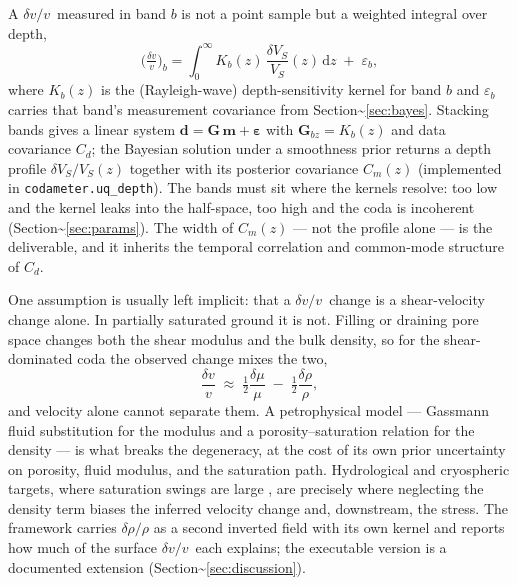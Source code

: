 \documentclass[
  11pt,
  letterpaper,
]{article}
\providecommand{\dvv}{\ensuremath{\delta v/v}}
\begin{document}
A \dvv~measured in band \(b\) is not a point sample but a weighted
integral over depth, \begin{equation}
\Big(\tfrac{\delta v}{v}\Big)_b = \int_0^\infty K_b(z)\,\frac{\delta V_S}{V_S}(z)\,\mathrm{d}z \;+\; \varepsilon_b,
\label{eq:kernel}
\end{equation} where \(K_b(z)\) is the (Rayleigh-wave) depth-sensitivity
kernel for band \(b\) and \(\varepsilon_b\) carries that band's
measurement covariance from Section\textasciitilde{}\ref{sec:bayes}.
Stacking bands gives a linear system
\(\mathbf{d}=\mathbf{G}\,\mathbf{m}+\boldsymbol\varepsilon\) with
\(\mathbf{G}_{bz}=K_b(z)\) and data covariance \(C_d\); the Bayesian
solution under a smoothness prior returns a depth profile
\(\delta V_S/V_S(z)\) together with its posterior covariance \(C_m(z)\)
(implemented in \texttt{codameter.uq\_depth}). The bands must sit where
the kernels resolve: too low and the kernel leaks into the half-space,
too high and the coda is incoherent
(Section\textasciitilde{}\ref{sec:params}). The width of \(C_m(z)\) ---
not the profile alone --- is the deliverable, and it inherits the
temporal correlation and common-mode structure of \(C_d\).

One assumption is usually left implicit: that a \dvv~change is a
shear-velocity change alone. In partially saturated ground it is not.
Filling or draining pore space changes both the shear modulus and the
bulk density, so for the shear-dominated coda the observed change mixes
the two, \begin{equation}
\frac{\delta v}{v} \;\approx\; \tfrac12\frac{\delta\mu}{\mu} \;-\; \tfrac12\frac{\delta\rho}{\rho},
\label{eq:density}
\end{equation} and velocity alone cannot separate them. A petrophysical
model --- Gassmann fluid substitution for the modulus and a
porosity--saturation relation for the density
\citep{Gassmann1951, Mavko2009} --- is what breaks the degeneracy, at
the cost of its own prior uncertainty on porosity, fluid modulus, and
the saturation path. Hydrological and cryospheric targets, where
saturation swings are large \citep{Clements2018, James2019}, are
precisely where neglecting the density term biases the inferred velocity
change and, downstream, the stress. The framework carries
\(\delta\rho/\rho\) as a second inverted field with its own kernel and
reports how much of the surface \dvv~each explains; the executable
version is a documented extension
(Section\textasciitilde{}\ref{sec:discussion}).
\end{document}
